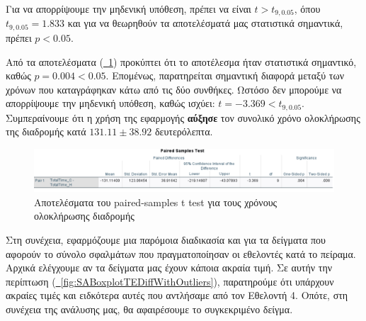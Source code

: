 Για να απορρίψουμε την μηδενική υπόθεση, πρέπει να είναι $t > t_{9,0.05}$, όπου $t_{9,0.05} = 1.833$ και για να θεωρηθούν τα αποτελέσματά μας στατιστικά σημαντικά, πρέπει $p < 0.05$.

Από τα αποτελέσματα (\hyperref[fig:SATTestTTDiff]{\schema~\ref*{fig:SATTestTTDiff}}) προκύπτει ότι το αποτέλεσμα ήταν στατιστικά σημαντικό, καθώς $p = 0.004 < 0.05$. Επομένως, παρατηρείται σημαντική διαφορά μεταξύ των χρόνων που καταγράφηκαν κάτω από τις δύο συνθήκες. Ωστόσο δεν μπορούμε να απορρίψουμε την μηδενική υπόθεση, καθώς ισχύει: $t = -3.369 < t_{9,0.05}$. Συμπεραίνουμε ότι η χρήση της εφαρμογής \textbf{αύξησε} τον συνολικό χρόνο ολοκλήρωσης της διαδρομής κατά $131.11 \pm 38.92$ δευτερόλεπτα.

\begin{figure}[!h]
    \centering
    \includegraphics[width=1\linewidth]{./images/SA_TTestResult_TotalTimeDiff.png}
    \caption{Αποτελέσματα του paired-samples t test για τους χρόνους ολοκλήρωσης διαδρομής}\label{fig:SATTestTTDiff}
\end{figure}

Στη συνέχεια, εφαρμόζουμε μια παρόμοια διαδικασία και για τα δείγματα που αφορούν το σύνολο σφαλμάτων που πραγματοποίησαν οι εθελοντές κατά το πείραμα. Αρχικά ελέγχουμε αν τα δείγματα μας έχουν κάποια ακραία τιμή. Σε αυτήν την περίπτωση (\hyperref[fig:SABoxplotTEDiffWithOutliers]{\schema~\ref*{fig:SABoxplotTEDiffWithOutliers}}), παρατηρούμε ότι υπάρχουν ακραίες τιμές και ειδκότερα αυτές που αντλήσαμε από τον Εθελοντή 4. Οπότε, στη συνέχεια της ανάλυσης μας, θα αφαιρέσουμε το συγκεκριμένο δείγμα.


